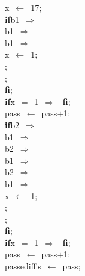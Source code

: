 \documentclass{report}
\begin{document}
\begin{tabbing}
x\ $\leftarrow$\ 17;\\
{\bf if}\>b1\ $\Rightarrow$
\\
\>b1\ $\Rightarrow$
\\
\>\>b1\ $\Rightarrow$
\\
\>\>\>x\ $\leftarrow$\ 1;\\
\>;
\\
;
\\
{\bf {f}{i}};
\\
{\bf if}\>x\ $=$\ 1\ $\Rightarrow$
\ {\bf {f}{i}};
\\
pass\ $\leftarrow$\ pass$+$1;\\
{\bf if}\>b2\ $\Rightarrow$
\\
\raisebox{2pt}{\ \ \framebox[2pt]{\rule{0pt}{1pt}}}
\>b1\ $\Rightarrow$
\\
\>b2\ $\Rightarrow$
\\
\>\raisebox{2pt}{\ \ \framebox[2pt]{\rule{0pt}{1pt}}}
\>b1\ $\Rightarrow$
\\
\>\>b2\ $\Rightarrow$
\\
\>\>\raisebox{2pt}{\ \ \framebox[2pt]{\rule{0pt}{1pt}}}
\>b1\ $\Rightarrow$
\\
\>\>\>x\ $\leftarrow$\ 1;\\
\>;
\\
;
\\
{\bf {f}{i}};
\\
{\bf if}\>x\ $=$\ 1\ $\Rightarrow$
\ {\bf {f}{i}};
\\
pass\ $\leftarrow$\ pass$+$1;\\
passediffis\ $\leftarrow$\ pass;\\
\end{tabbing}
\end{document}
